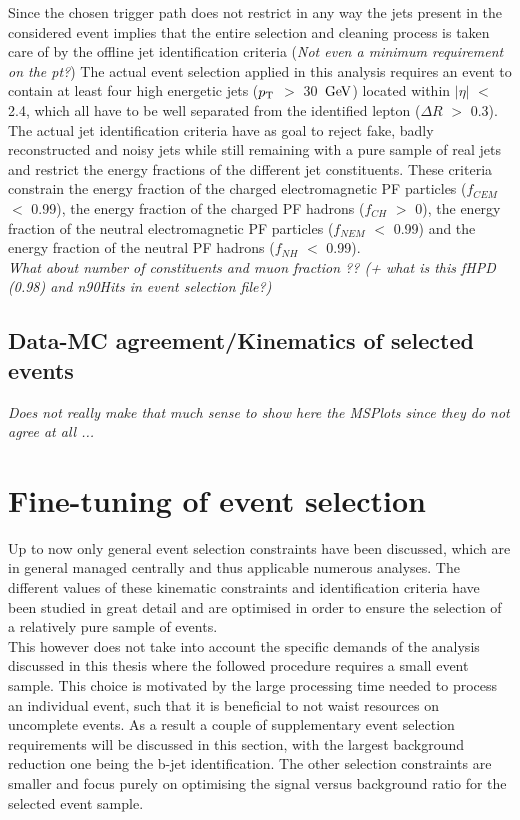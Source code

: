 Since the chosen trigger path does not restrict in any way the jets present in the considered event implies that the entire selection and cleaning process is taken care of by the offline jet identification criteria (\textit{Not even a minimum requirement on the pt?})
The actual event selection applied in this analysis requires an event to contain at least four high energetic jets ($p_{\rm T}$ $>$ 30 $\, \mathrm{GeV}$) located within $\vert \eta \vert$ $<$ 2.4, which all have to be well separated from the identified lepton ($\Delta R$ $>$ 0.3).
The actual jet identification criteria have as goal to reject fake, badly reconstructed and noisy jets while still remaining with a pure sample of real jets and restrict the energy fractions of the different jet constituents. These criteria constrain the energy fraction of the charged electromagnetic PF particles ($f_{CEM}$ $<$ 0.99), the energy fraction of the charged PF hadrons ($f_{CH}$ $>$ 0), the energy fraction of the neutral electromagnetic PF particles ($f_{NEM}$ $<$ 0.99) and the energy fraction of the neutral PF hadrons ($f_{NH}$ $<$ 0.99).
\\

\textit{What about number of constituents and muon fraction ?? (+ what is this fHPD (0.98) and n90Hits in event selection file?)}

\subsection{Data-MC agreement/Kinematics of selected events}
\textit{Does not really make that much sense to show here the MSPlots since they do not agree at all ...}

\section{Fine-tuning of event selection}\label{sec::SpecificSelec}
Up to now only general event selection constraints have been discussed, which are in general managed centrally and thus applicable numerous analyses. The different values of these kinematic constraints and identification criteria have been studied in great detail and are optimised in order to ensure the selection of a relatively pure sample of events.
\\
This however does not take into account the specific demands of the analysis discussed in this thesis where the followed procedure requires a small event sample. 
This choice is motivated by the large processing time needed to process an individual event, such that it is beneficial to not waist resources on uncomplete events.
As a result a couple of supplementary event selection requirements will be discussed in this section, with the largest background reduction one being the b-jet identification. The other selection constraints are smaller and focus purely on optimising the signal versus background ratio for the selected event sample.

